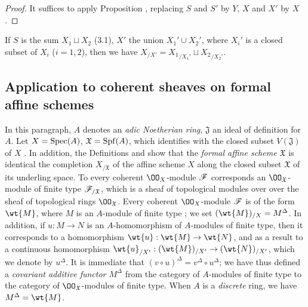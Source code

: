 \begin{proof}
\label{proof-1.10.9.9}
It suffices to apply Proposition , replacing $S$ and $S'$ by $Y$, $X$ and $X'$ by $X$.
\end{proof}

\begin{rmk}[10.9.10]
\label{1.10.9.10}
If $S$ is the sum $X_1\sqcup X_2$ (3.1), $X'$ the union $X_1'\cup X_2'$, where $X_i'$ is a closed subset of $X_i$ ($i=1,2$), then we have $X_{/X'}={X_1}_{/X_1'}\sqcup{X_2}_{/X_2'}$.
\end{rmk}

\subsection{Application to coherent sheaves on formal affine schemes}
\label{subsection:1.10.10}

\begin{env}[10.10.1]
\label{1.10.10.1}
In this paragraph, $A$ denotes an \emph{adic Noetherian ring}, $\mathfrak{J}$ an ideal of definition for $A$.
Let $X=\operatorname{Spec}(A)$, $\mathfrak{X}=\operatorname{Spf}(A)$, which identifies with the closed subset $V(\mathfrak{J})$ of $X$ .
In addition, the Definitions  and  show that the \emph{formal affine scheme $\mathfrak{X}$} is identical the completion $X_{/\mathfrak{X}}$ of the affine scheme $X$ along the closed subset $\mathfrak{X}$ of its underling space.
To every coherent $\OO_X$-module $\mathscr{F}$ corresponds an $\OO_\mathfrak{X}$-module of finite type $\mathscr{F}_{/\mathfrak{X}}$, which is a sheaf of topological modules over over the sheaf of topological rings $\OO_\mathfrak{X}$.
Every coherent $\OO_X$-module $\mathscr{F}$ is of the form $\wt{M}$, where $M$ is an $A$-module of finite type ; we set $(\wt{M})_{/X}=M^\Delta$.
In addition, if $u:M\to N$ is an $A$-homomorphism of $A$-modules of finite type, then it corresponds to a homomorphism $\wt{u}:\wt{M}\to\wt{N}$, and as a result to a continuous homomorphism $\wt{u}_{/X'}:(\wt{M})_{/X'}\to(\wt{N})_{/X'}$, which we denote by $u^\Delta$.
It is immediate that $(v\circ u)^\Delta=v^\Delta\circ u^\Delta$; we have thus defined a \emph{covariant additive functor $M^\Delta$} from the category of $A$-modules of finite type to the category of $\OO_\mathfrak{X}$-modules of finite type.
When $A$ is a \emph{discrete} ring, we have $M^\Delta=\wt{M}$.
\end{env}


